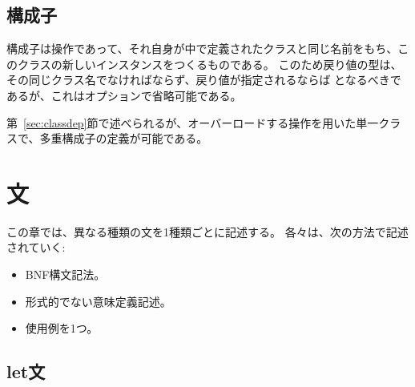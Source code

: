 \documentclass[\pformat,12pt]{jarticle}
\begin{document}
\subsection{構成子}\label{constructors}

構成子は操作であって、それ自身が中で定義されたクラスと同じ名前をもち、このクラスの新しいインスタンスをつくるものである。
このため戻り値の型は、その同じクラス名でなければならず、戻り値が指定されるならば となるべきであるが、これはオプションで省略可能である。

第~\ref{sec:classdep}節で述べられるが、オーバーロードする操作を用いた単一クラスで、多重構成子の定義が可能である。 


\section{文}\label{sec:stmt}

この章では、異なる種類の文を1種類ごとに記述する。 
各々は、次の方法で記述されていく:
\begin{itemize}
\item BNF構文記法。
\item 形式的でない意味定義記述。
\item 使用例を1つ。
\end{itemize}

\subsection{let文}\label{letstmt}
\end{document}

